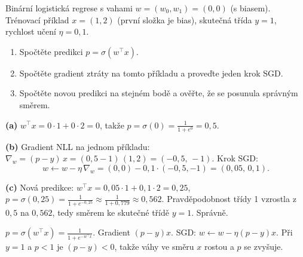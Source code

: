 \begin{zadani}
Binární logistická regrese s vahami $w=(w_0,w_1)=(0,0)$ (s biasem). Trénovací příklad $x=(1,2)$ (první složka je bias), skutečná třída $y=1$, rychlost učení $\eta=0{,}1$.
\begin{enumerate}[label=(\alph*)]
  \item {} Spočtěte predikci $p=\sigma(w^{\!\top}x)$.
  \item {} Spočtěte gradient ztráty na tomto příkladu a proveďte jeden krok SGD.
  \item {} Spočtěte novou predikci na stejném bodě a ověřte, že se posunula správným směrem.
\end{enumerate}
\end{zadani}

\begin{reseni}
\textbf{(a)} $w^{\!\top}x=0\cdot1+0\cdot2=0$, takže $p=\sigma(0)=\tfrac{1}{1+e^{0}}=0{,}5$.

\textbf{(b)} Gradient NLL na jednom příkladu: $\nabla_w=(p-y)\,x=(0{,}5-1)\,(1,2)=(-0{,}5,\,-1)$. Krok SGD:
\[
w\leftarrow w-\eta\,\nabla_w=(0,0)-0{,}1\cdot(-0{,}5,-1)=(0{,}05,\,0{,}1).
\]

\textbf{(c)} Nová predikce: $w^{\!\top}x=0{,}05\cdot1+0{,}1\cdot2=0{,}25$, $p=\sigma(0{,}25)=\tfrac{1}{1+e^{-0{,}25}}\approx\tfrac{1}{1+0{,}779}\approx0{,}562$. Pravděpodobnost třídy 1 vzrostla z $0{,}5$ na $0{,}562$, tedy směrem ke skutečné třídě $y=1$. Správně.
\end{reseni}

\begin{jadro}
$p=\sigma(w^{\!\top}x)=\frac{1}{1+e^{-w^{\!\top}x}}$. Gradient $(p-y)x$. SGD: $w\leftarrow w-\eta(p-y)x$. Při $y=1$ a $p<1$ je $(p-y)<0$, takže váhy ve směru $x$ rostou a $p$ se zvyšuje.
\end{jadro}

